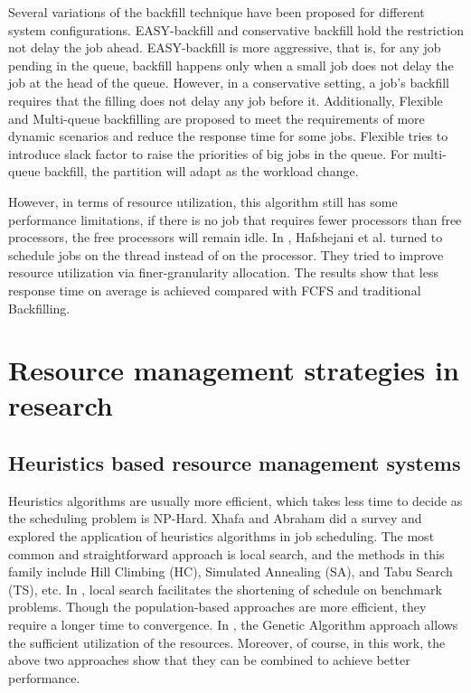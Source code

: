 Several variations of the backfill technique have been proposed for different system configurations.
EASY-backfill and conservative backfill hold the restriction not delay the job ahead\cite{4797220}.
EASY-backfill is more aggressive, that is, for any job pending in the queue, backfill happens only when a small job does not delay the job at the head of the queue. 
However, in a conservative setting, a job’s backfill requires that the filling does not delay any job before it. 
Additionally, Flexible\cite{talby1999supporting} and Multi-queue backfilling\cite{lawson2002multiple} are proposed to meet the requirements of more dynamic scenarios and reduce the response time for some jobs. 
Flexible tries to introduce slack factor to raise the priorities of big jobs in the queue. For multi-queue backfill, the partition will adapt as the workload change.

However, in terms of resource utilization, this algorithm still has some performance limitations, if there is no job that requires fewer processors than free processors, the free processors will remain idle. 
In \cite{hafshejani2013efficient}, Hafshejani et al. turned to schedule jobs on the thread instead of on the processor. 
They tried to improve resource utilization via finer-granularity allocation. 
The results show that less response time on average is achieved compared with FCFS and traditional Backfilling.
 
\section{Resource management strategies in research}
\subsection{Heuristics based resource management systems}
Heuristics algorithms are usually more efficient, which takes less time to decide as the scheduling problem is NP-Hard. 
Xhafa and Abraham did a survey\cite{xhafa2010computational} and explored the application of heuristics algorithms in job scheduling. 
The most common and straightforward approach is local search, and the methods in this family include Hill Climbing (HC), Simulated Annealing (SA), and Tabu Search (TS), etc. 
In \cite{ritchie2003fast}, local search facilitates the shortening of schedule on benchmark problems. 
Though the population-based approaches are more efficient, they require a longer time to convergence. 
In \cite{abraham2000nature}, the Genetic Algorithm approach allows the sufficient utilization of the resources. 
Moreover, of course, in this work, the above two approaches show that they can be combined to achieve better performance. 

